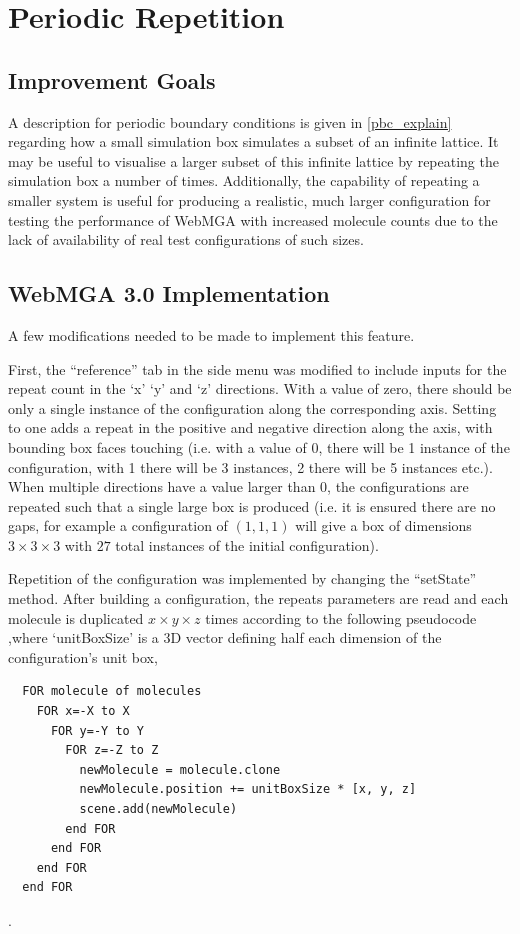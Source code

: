 \section{Periodic Repetition}
\label{peridodic_section}
\subsection{Improvement Goals}
A description for periodic boundary conditions is given in \cref{pbc_explain} regarding how a small simulation box simulates a subset of an infinite lattice. It may be useful to visualise a larger subset of this infinite lattice by repeating the simulation box a number of times. Additionally, the capability of repeating a smaller system is useful for producing a realistic, much larger configuration for testing the performance of WebMGA with increased molecule counts due to the lack of availability of real test configurations of such sizes.

\subsection{WebMGA 3.0 Implementation}
A few modifications needed to be made to implement this feature.

First, the ``reference'' tab in the side menu was modified to include inputs for the repeat count in the `x' `y' and `z' directions. With a value of zero, there should be only a single instance of the configuration along the corresponding axis. Setting to one adds a repeat in the positive and negative direction along the axis, with bounding box faces touching (i.e. with a value of 0, there will be 1 instance of the configuration, with 1 there will be 3 instances, 2 there will be 5 instances etc.). When multiple directions have a value larger than 0, the configurations are repeated such that a single large box is produced (i.e. it is ensured there are no gaps, for example a configuration of $(1,1,1)$ will give a box of dimensions $3\times 3\times 3$ with $27$ total instances of the initial configuration).

Repetition of the configuration was implemented by changing the ``setState'' method. After building a configuration, the repeats parameters are read and each molecule is duplicated $x \times y \times z$ times according to the following pseudocode ,where `unitBoxSize' is a 3D vector defining half each dimension of the configuration's unit box,

\begin{lstlisting}
  FOR molecule of molecules
    FOR x=-X to X
      FOR y=-Y to Y
        FOR z=-Z to Z
          newMolecule = molecule.clone
          newMolecule.position += unitBoxSize * [x, y, z]
          scene.add(newMolecule)
        end FOR
      end FOR
    end FOR
  end FOR
\end{lstlisting}.

